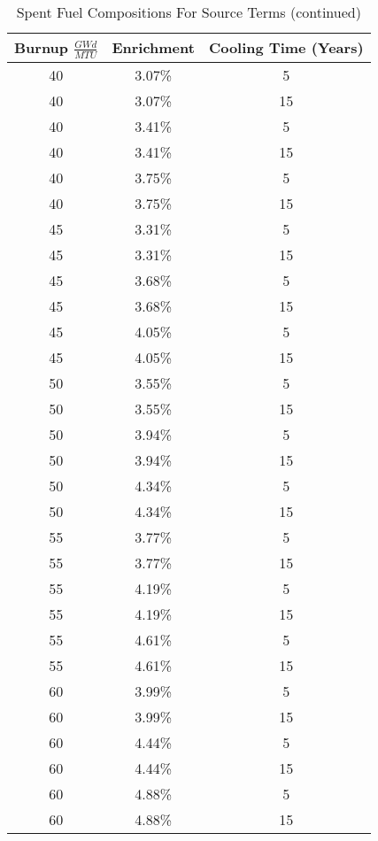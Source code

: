 \begin{table}[p!]
\caption{Spent Fuel Compositions For Source Terms (continued)}
\label{source2}
\begin{center}
\begin{tabular}[b]{|c|c|c|}
	\hline
	Burnup $\frac{GWd}{MTU}$ & Enrichment & Cooling Time (Years)\\ \hline
	40 & 3.07\% & 5 \\ \hline
	40 & 3.07\% & 15 \\ \hline
	40 & 3.41\% & 5 \\ \hline
	40 & 3.41\% & 15 \\ \hline
	40 & 3.75\% & 5 \\ \hline
	40 & 3.75\% & 15 \\ \hline
	45 & 3.31\% & 5 \\ \hline
	45 & 3.31\% & 15 \\ \hline
	45 & 3.68\% & 5 \\ \hline
	45 & 3.68\% & 15 \\ \hline
	45 & 4.05\% & 5 \\ \hline
	45 & 4.05\% & 15 \\ \hline
	50 & 3.55\% & 5 \\ \hline
	50 & 3.55\% & 15 \\ \hline
	50 & 3.94\% & 5 \\ \hline
	50 & 3.94\% & 15 \\ \hline
	50 & 4.34\% & 5 \\ \hline
	50 & 4.34\% & 15 \\ \hline
	55 & 3.77\% & 5 \\ \hline
	55 & 3.77\% & 15 \\ \hline
	55 & 4.19\% & 5 \\ \hline
	55 & 4.19\% & 15 \\ \hline
	55 & 4.61\% & 5 \\ \hline
	55 & 4.61\% & 15 \\ \hline
	60 & 3.99\% & 5 \\ \hline
	60 & 3.99\% & 15 \\ \hline
	60 & 4.44\% & 5 \\ \hline
	60 & 4.44\% & 15 \\ \hline
	60 & 4.88\% & 5 \\ \hline
	60 & 4.88\% & 15 \\ \hline

\end{tabular}
\end{center}
\end{table}


